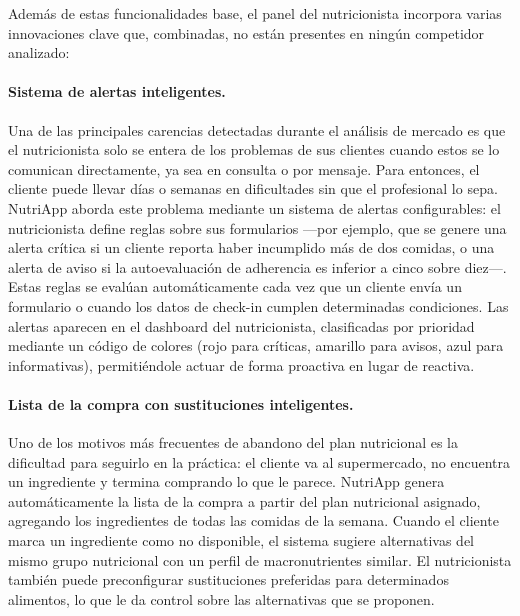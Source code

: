 Además de estas funcionalidades base, el panel del nutricionista incorpora varias innovaciones clave que, combinadas, no están presentes en ningún competidor analizado:

\paragraph{Sistema de alertas inteligentes.}
Una de las principales carencias detectadas durante el análisis de mercado es que el nutricionista solo se entera de los problemas de sus clientes cuando estos se lo comunican directamente, ya sea en consulta o por mensaje. Para entonces, el cliente puede llevar días o semanas en dificultades sin que el profesional lo sepa. NutriApp aborda este problema mediante un sistema de alertas configurables: el nutricionista define reglas sobre sus formularios ---por ejemplo, que se genere una alerta crítica si un cliente reporta haber incumplido más de dos comidas, o una alerta de aviso si la autoevaluación de adherencia es inferior a cinco sobre diez---. Estas reglas se evalúan automáticamente cada vez que un cliente envía un formulario o cuando los datos de check-in cumplen determinadas condiciones. Las alertas aparecen en el dashboard del nutricionista, clasificadas por prioridad mediante un código de colores (rojo para críticas, amarillo para avisos, azul para informativas), permitiéndole actuar de forma proactiva en lugar de reactiva.

\paragraph{Lista de la compra con sustituciones inteligentes.}
Uno de los motivos más frecuentes de abandono del plan nutricional es la dificultad para seguirlo en la práctica: el cliente va al supermercado, no encuentra un ingrediente y termina comprando lo que le parece. NutriApp genera automáticamente la lista de la compra a partir del plan nutricional asignado, agregando los ingredientes de todas las comidas de la semana. Cuando el cliente marca un ingrediente como no disponible, el sistema sugiere alternativas del mismo grupo nutricional con un perfil de macronutrientes similar. El nutricionista también puede preconfigurar sustituciones preferidas para determinados alimentos, lo que le da control sobre las alternativas que se proponen.


